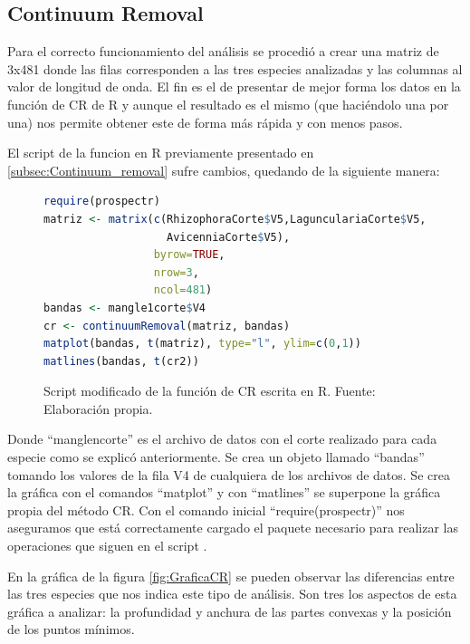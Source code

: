 \subsection{Continuum Removal}

Para el correcto funcionamiento del análisis se procedió a crear una matriz de 3x481 donde las filas corresponden a las tres especies analizadas y las columnas al valor de longitud de onda. El fin es el de presentar de mejor forma los datos en la función de \ac{CR} de R y aunque el resultado es el mismo (que haciéndolo una por una) nos permite obtener este de forma más rápida y con menos pasos.\Sep

El script de la funcion en R previamente presentado en \ref{subsec:Continuum_removal} sufre cambios, quedando de la siguiente manera:\SmallSep

\begin{figure}[ht]
	\centering
	\begin{lstlisting}[language = R, frame = single]
require(prospectr)
matriz <- matrix(c(RhizophoraCorte$V5,LagunculariaCorte$V5,
                   AvicenniaCorte$V5),
                 byrow=TRUE,
                 nrow=3,
                 ncol=481)
bandas <- mangle1corte$V4
cr <- continuumRemoval(matriz, bandas)
matplot(bandas, t(matriz), type="l", ylim=c(0,1))
matlines(bandas, t(cr2))
	\end{lstlisting}
	\caption[Función modificada de CR]{Script modificado de la función de CR escrita en R. Fuente: Elaboración propia.}
	\label{fig:CRmodificado}
\end{figure}	

Donde ``manglencorte'' es el archivo de datos con el corte realizado para cada especie como se explicó anteriormente. Se crea un objeto llamado ``bandas'' tomando los valores de la fila V4 de cualquiera de los archivos de datos. Se crea la gráfica con el comandos ``matplot'' y con ``matlines'' se superpone la gráfica propia del método \ac{CR}. Con el comando inicial ``require(prospectr)'' nos aseguramos que está correctamente cargado el paquete necesario para realizar las operaciones que siguen en el script \citep{stevens2014introduction}. \Sep

En la gráfica de la figura \ref{fig:GraficaCR} se pueden observar las diferencias entre las tres especies que nos indica este tipo de análisis. Son tres los aspectos de esta gráfica a analizar: la profundidad y anchura de las partes convexas y la posición de los puntos mínimos.\Sep

